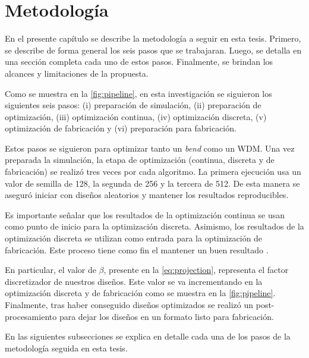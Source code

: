 \chapter{Metodología}

En el presente capítulo se describe la metodología a seguir en esta tesis.
Primero, se describe de forma general los seis pasos que se trabajaran.
Luego, se detalla en una sección completa cada uno de estos pasos.
Finalmente, se brindan los alcances y limitaciones de la propuesta.

Como se muestra en la \autoref{fig:pipeline}, en esta investigación se siguieron los siguientes seis pasos:
(i) preparación de simulación, 
(ii) preparación de optimización, 
(iii) optimización continua,
(iv) optimización discreta,
(v) optimización de fabricación y
(vi) preparación para fabricación.

Estos pasos se siguieron para optimizar tanto un \emph{bend} como un WDM.
Una vez preparada la simulación, la etapa de optimización (continua, discreta y de fabricación) se realizó
tres veces por cada algoritmo.
La primera ejecución usa un valor de semilla de 128, la segunda de 256 y la tercera de 512.
De esta manera se aseguró iniciar con diseños aleatorios y mantener los resultados reproducibles.

Es importante señalar que los resultados de la optimización continua se usan como punto de inicio
para la optimización discreta. Asimismo, los resultados de la optimización discreta se utilizan como
entrada para la optimización de fabricación.
Este proceso tiene como fin el mantener un buen resultado \citep{Yang2017}.


En particular, el valor de $\beta$, presente en la \autoref{eq:projection}, representa el factor discretizador de nuestros diseños.
Este valor se va incrementando en la optimización discreta y de fabricación como se muestra en la
\autoref{fig:pipeline}.
Finalmente, tras haber conseguido diseños optimizados se realizó un post-procesamiento para dejar los diseños
en un formato listo para fabricación.

En las siguientes subsecciones se explica en detalle cada una de los pasos de la metodología seguida en esta tesis.

